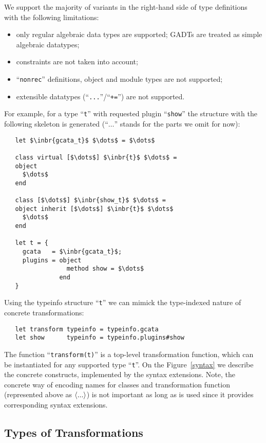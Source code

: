 We support the majority of variants in the right-hand side of type definitions with the following limitations:

\begin{itemize}
\item only regular algebraic data types are supported; GADTs are treated as simple algebraic datatypes;
\item constraints are not taken into account;
\item ``\lstinline{nonrec}'' definitions, object and module types are not supported;
\item extensible datatypes (``\lstinline{...}''/``\lstinline{+=}'') are not supported.
\end{itemize}

For example, for a type ``\lstinline{t}'' with requested plugin ``\lstinline{show}'' the structure with the following skeleton is generated (``$\dots$'' stands for the parts we omit for now):

\begin{lstlisting}
   let $\inbr{gcata_t}$ $\dots$ = $\dots$
   
   class virtual [$\dots$] $\inbr{t}$ $\dots$ =
   object
     $\dots$
   end

   class [$\dots$] $\inbr{show_t}$ $\dots$ =
   object inherit [$\dots$] $\inbr{t}$ $\dots$
     $\dots$
   end

   let t = {
     gcata   = $\inbr{gcata_t}$;
     plugins = object
                 method show = $\dots$
               end
   }
\end{lstlisting}

Using the typeinfo structure ``\lstinline{t}'' we can mimick the type-indexed nature of concrete transformations:

\begin{lstlisting}
   let transform typeinfo = typeinfo.gcata
   let show      typeinfo = typeinfo.plugins#show
\end{lstlisting}

The function ``\lstinline{transform(t)}'' is a top-level transformation function, which can be instantiated for any supported type ``\lstinline{t}''. On the
Figure~\ref{syntax} we describe the concrete constructs, implemented by the syntax extensions. Note, the concrete way of encoding names
for classes and transformation function (represented above as $\left<...\right>$) is not important as long as  is
used since it provides corresponding syntax extensions.

\subsection{Types of Transformations}

